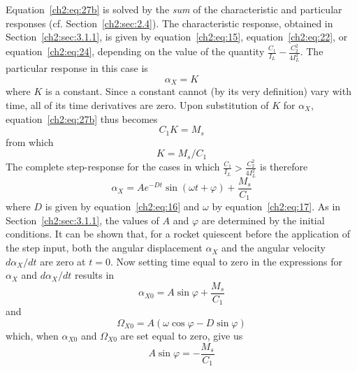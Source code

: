 Equation~\eqref{ch2:eq:27b} is solved by the \emph{sum} of the characteristic
and particular responses (cf. Section~\ref{ch2:sec:2.4}). The characteristic
response, obtained in Section~\ref{ch2:sec:3.1.1}, is given by
equation~\eqref{ch2:eq:15}, equation~\eqref{ch2:eq:22}, or
equation~\eqref{ch2:eq:24}, depending on the value of the quantity
$\frac{C_1}{I_L} - \frac{C_2^{2}}{4 I_L^{2}}$. The particular response in this
case is
\begin{equation}\label{ch2:eq:28}
\alpha_X = K
\end{equation}
where $K$ is a constant. Since a constant cannot (by its very definition) vary
with time, all of its time derivatives are zero. Upon substitution of $K$ for
$\alpha_X$, equation~\eqref{ch2:eq:27b} thus becomes
\begin{equation*}
C_1 K = M_s
\end{equation*}
from which
\begin{equation}\label{ch2:eq:29}
K = M_s/C_1
\end{equation}
The complete step-response for the cases in which
$\frac{C_1}{I_L} > \frac{C_2^{2}}{4 I_L^{2}}$ is therefore
\begin{equation}\label{ch2:eq:30}
\alpha_X = A e^{-Dt}\sin(\omega t + \varphi) + \frac{M_s}{C_1}
\end{equation}
where $D$ is given by equation~\eqref{ch2:eq:16} and $\omega$ by
equation~\eqref{ch2:eq:17}. As in Section~\ref{ch2:sec:3.1.1}, the values of
$A$ and $\varphi$ are determined by the initial conditions. It can be shown
that, for a rocket quiescent before the application of the step input, both the
angular displacement $\alpha_X$ and the angular velocity $d\alpha_X/dt$ are
zero at $t = 0$. Now setting time equal to zero in the expressions for
$\alpha_X$ and $d\alpha_X/dt$ results in
\begin{equation*}
\alpha_{X0} = A\sin\varphi + \frac{M_s}{C_1}
\end{equation*}
and
\begin{equation*}
\Omega_{X0} = A(\omega\cos\varphi - D\sin\varphi)
\end{equation*}
which, when $\alpha_{X0}$ and $\Omega_{X0}$ are set equal to zero, give us
\begin{equation*}
A\sin\varphi = -\frac{M_s}{C_1}
\end{equation*}
